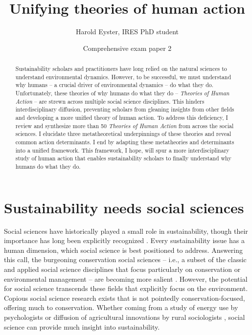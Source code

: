 \documentclass[12 pt]{article}
\title{\Huge Unifying theories of human action \\ \bigskip }
\author{\Large Harold Eyster, IRES PhD student}
\date{Comprehensive exam paper 2}
\begin{document}
	\maketitle
\color {black}

\begin{abstract}
Sustainability scholars and practitioners have long relied on the natural sciences to understand environmental dynamics. However, to be successful, we must understand why humans -- a crucial driver of environmental dynamics --  do what they do. Unfortunately, these theories of why humans do what they do -- \textit{Theories of Human Action} -- are strewn across multiple social science disciplines. This hinders interdisciplinary diffusion, preventing scholars from gleaning insights from other fields and developing a more unified theory of human action. To address this deficiency, I review and synthesize more than 50 \textit{Theories of Human Action} from across the social sciences. I elucidate three metatheoretical underpinnings of these theories and reveal common action determinants. I end by adapting these metatheories and determinants into a unified framework. This framework, I hope, will spur a more interdisciplinary study of human action that enables sustainability scholars to finally understand why humans do what they do.   
\end{abstract}
\section{Sustainability needs social sciences}
Social sciences have historically played a small role in sustainability, though their importance  has long been explicitly recognized \parencite{Leopold1949}. Every sustainability issue has a human dimension, which social science is best positioned to address. Answering this call, the burgeoning conservation social sciences -- i.e., a subset of the classic and applied social science disciplines that focus particularly on conservation or environmental management -- are becoming more salient \parencite{Bennett2017,Teel2018}. However, the potential for social science transcends these fields that explicitly focus on the environment.  Copious social science research exists that is not pointedly conservation-focused, offering much to conservation. Whether coming from a study of energy use by psychologists \parencite{Schultz2007,Schultz2018} or diffusion of agricultural innovations by rural sociologists \parencite{Rogers2010,Mascia2018}, social science can provide much insight into sustainability. 
\end{document}
